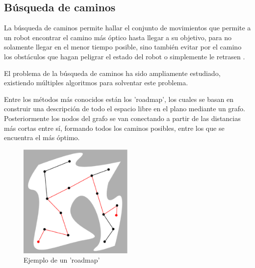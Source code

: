 \subsection{Búsqueda de caminos}

La búsqueda de caminos permite hallar el conjunto de movimientos que permite a
un robot encontrar el camino más óptico hasta llegar a su objetivo, para no
solamente llegar en el menor tiempo posible, sino también evitar por el camino
los obstáculos que hagan peligrar el estado del robot o simplemente le retrasen
\cite{Planning}.

El problema de la búsqueda de caminos ha sido ampliamente estudiado, existiendo
múltiples algoritmos para solventar este problema. 

Entre los métodos más conocidos están los 'roadmap', los cuales se basan en
construir una descripción de todo el espacio libre en el plano mediante un
grafo. Posteriormente los nodos del grafo se van conectando a partir de las
distancias más cortas entre sí, formando todos los caminos posibles, entre los
que se encuentra el más óptimo.

\begin{figure}[!th]
  \begin{center}
    \includegraphics[width=0.5\textwidth]{images/cap2/BusquedaCaminosRoadmap.eps}
    \caption{Ejemplo de un 'roadmap'}
    \label{fig:BusquedaCaminosRoadmap}
  \end{center}
\end{figure}

